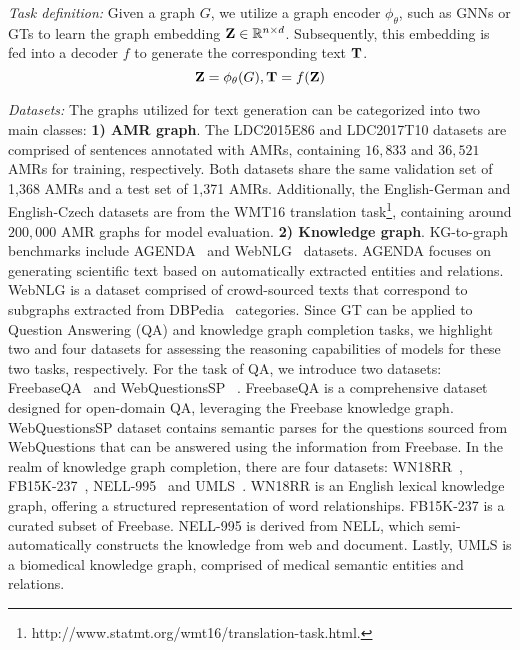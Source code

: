 \textit{Task definition:} Given a graph $G$, we utilize a graph encoder $\phi_{\theta}$, such as GNNs or GTs to learn the graph embedding $\mathbf{Z} \in \mathbb{R}^{n \times d}$. Subsequently, this embedding is fed into a decoder $f$ to generate the corresponding text $\mathbf{T}$.
\begin{equation}
    \mathbf{Z} = \phi_{\theta}(G), \mathbf{T} = f(\mathbf{Z})
\end{equation}

\textit{Datasets:} The graphs utilized for text generation can be categorized into two main classes: \textbf{1) AMR graph}. The LDC2015E86 and LDC2017T10 datasets are comprised of sentences annotated with AMRs, containing $16,833$ and $36,521$ AMRs for training, respectively. Both datasets share the same validation set of 1,368 AMRs and a test set of 1,371 AMRs. Additionally, the English-German and English-Czech datasets are from the WMT16 translation task\footnote{http://www.statmt.org/wmt16/translation-task.html.}, containing around $200,000$ AMR graphs for model evaluation. \textbf{2) Knowledge graph}. KG-to-graph benchmarks include AGENDA~\cite{koncel2019text} and WebNLG~\cite{gardent-etal-2017-webnlg} datasets. AGENDA focuses on generating scientific text based on automatically extracted entities and relations. WebNLG is a dataset comprised of crowd-sourced texts that correspond to subgraphs extracted from DBPedia~\cite{auer2007dbpedia} categories. 
Since GT can be applied to Question Answering (QA) and knowledge graph completion tasks, we highlight two and four datasets for assessing the reasoning capabilities of models for these two tasks, respectively. 
For the task of QA, we introduce two datasets: FreebaseQA~\cite{FreebaseQA} and WebQuestionsSP ~\cite{WebQuestionsSP}. FreebaseQA is a comprehensive dataset designed for open-domain QA, leveraging the Freebase knowledge graph. WebQuestionsSP dataset contains semantic parses for the questions sourced from WebQuestions that can be answered using the information from Freebase.
In the realm of knowledge graph completion, there are four datasets: WN18RR~\cite{WN18RR}, FB15K-237~\cite{FB15K237}, NELL-995~\cite{NELL} and UMLS~\cite{UMLS}. WN18RR is an English lexical knowledge graph, offering a structured representation of word relationships. FB15K-237 is a curated subset of Freebase. NELL-995 is derived from NELL, which semi-automatically constructs the knowledge from web and document. Lastly, UMLS is a biomedical knowledge graph, comprised of medical semantic entities and relations.

